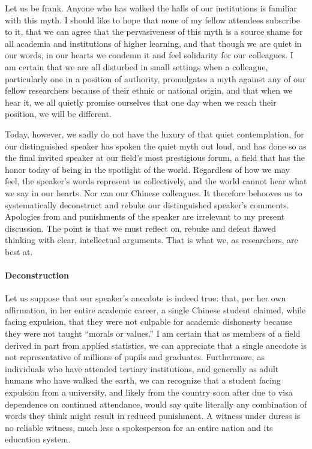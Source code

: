\documentclass[a4paper,12pt]{article}
\begin{document}
Let us be frank. Anyone who has walked the halls of our institutions is familiar with this myth. I should like to hope that none of my fellow attendees subscribe to it, that we can agree that the pervasiveness of this myth is a source shame for all academia and institutions of higher learning, and that though we are quiet in our words, in our hearts we condemn it and feel solidarity for our colleagues. I am certain that we are all disturbed in small settings when a colleague, particularly one in a position of authority, promulgates a myth against any of our fellow researchers because of their ethnic or national origin, and that when we hear it, we all quietly promise ourselves that one day when we reach their position, we will be different.

Today, however, we sadly do not have the luxury of that quiet contemplation, for our distinguished speaker has spoken the quiet myth out loud, and has done so as the final invited speaker at our field’s most prestigious forum, a field that has the honor today of being in the spotlight of the world. Regardless of how we may feel, the speaker’s words represent us collectively, and the world cannot hear what we say in our hearts. Nor can our Chinese colleagues. It therefore behooves us to systematically deconstruct and rebuke our distinguished speaker’s comments. Apologies from and punishments of the speaker are irrelevant to my present discussion. The point is that we must reflect on, rebuke and defeat flawed thinking with clear, intellectual arguments. That is what we, as researchers, are best at.

\paragraph{Deconstruction} Let us suppose that our speaker’s anecdote is indeed true: that, per her own affirmation, in her entire academic career, a single Chinese student claimed, while facing expulsion, that they were not culpable for academic dishonesty because they were not taught “morals or values.” I am certain that as members of a field derived in part from applied statistics, we can appreciate that a single anecdote is not representative of millions of pupils and graduates. Furthermore, as individuals who have attended tertiary institutions, and generally as adult humans who have walked the earth, we can recognize that a student facing expulsion from a university, and likely from the country soon after due to visa dependence on continued attendance, would say quite literally any combination of words they think might result in reduced punishment. A witness under duress is no reliable witness, much less a spokesperson for an entire nation and its education system.
\end{document}
